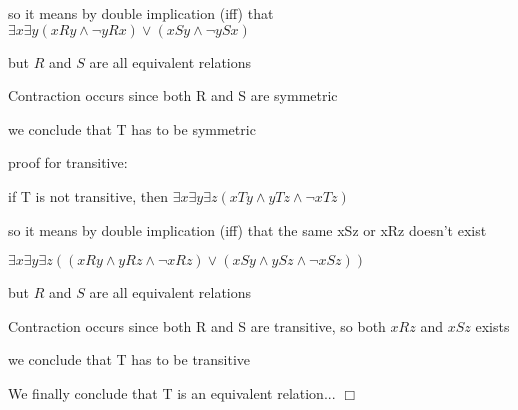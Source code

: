 \documentclass[12pts,A4]{article}
\begin{document}
\begin{flushleft}
    so it means by double implication (iff) that $ \exists x \exists y  ( xRy \wedge \neg y R x) 
    \vee ( xSy\wedge \neg y S x) $

    

    but $R$ and $S$ are all equivalent relations 

    Contraction occurs since both R and S are symmetric  


    we conclude that T has to be symmetric


    \bigskip

    proof for transitive:
    
    \bigskip

    if T is not transitive, then $ \exists x \exists y \exists z
    (xTy \wedge yTz \wedge \neg xTz)$

    so it means by double implication (iff) that the same xSz or xRz doesn't exist
    
    $ \exists x \exists y \exists z( (xRy \wedge yRz \wedge \neg xRz) \vee
(xSy \wedge ySz \wedge \neg xSz))$
    

    

    but $R$ and $S$ are all equivalent relations 

    Contraction occurs since both R and S are transitive, 
    so both $xRz$ and $xSz$ exists 


    we conclude that T has to be transitive


    \bigskip


    We finally conclude that T is an equivalent relation... $\Box$



\end{flushleft}
\end{document}
